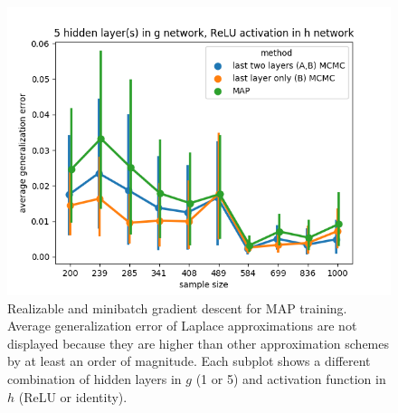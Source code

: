 \documentclass{article} %
\begin{document}
\begin{figure}[t!]
\begin{center}
		\includegraphics[scale=0.4]{taskid15.png}
	\end{center}
	\caption{Realizable and minibatch gradient descent for MAP training. Average generalization error of Laplace approximations are not displayed because they are higher than other approximation schemes by at least an order of magnitude. Each subplot shows a different combination of hidden layers in $g$ (1 or 5) and activation function in $h$ (ReLU or identity). }
	\label{fig:avg_gen_err_minibatch_realizable}
\end{figure}


\begin{table}[h!]%
	\centering

	\caption{Companion to Figure \ref{fig:avg_gen_err_minibatch_realizable}.}%
	\label{table::avg_gen_err_minibatch_realizable}%
	\begin{tiny}
	\begin{subtable}[t]{2.5in}
		\caption{1 hidden layer(s) in $g$, identity activation in $h$}
		
	\end{subtable}
	\quad
	\begin{subtable}[t]{2.5in}
		\caption{5 hidden layer(s) in $g$, identity activation in $h$}
		
	\end{subtable}
	\quad
	\begin{subtable}[t]{2.5in}
		\caption{1 hidden layer(s) in $g$, ReLU activation in $h$}
		
	\end{subtable}
	\quad
	\begin{subtable}[t]{2.5in}
		\caption{5 hidden layer(s) in $g$, ReLU activation in $h$}
		
	\end{subtable}
	\end{tiny}
\end{table}
\end{document}
